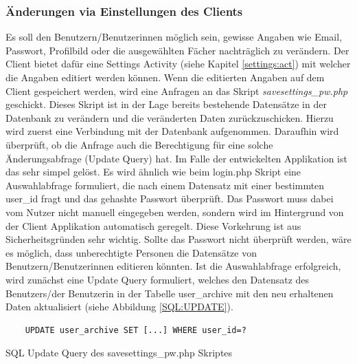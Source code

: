 \documentclass[a4paper,11pt]{report}
\newenvironment{code}{\captionsetup{type=figure}}{}
\begin{document}
					
					
					\subsubsection{Änderungen via Einstellungen des Clients}
					Es soll den Benutzern/Benutzerinnen möglich sein, gewisse Angaben wie Email, Passwort, Profilbild oder die ausgewählten Fächer nachträglich zu verändern. Der Client bietet dafür eine Settings Activity (siehe Kapitel \ref{settings:act}) mit welcher die Angaben editiert werden können. Wenn die editierten Angaben auf dem Client gespeichert werden, wird eine Anfragen an das Skript \emph{savesettings\_pw.php} geschickt. Dieses Skript ist in der Lage bereits bestehende Datensätze in der Datenbank zu verändern und die veränderten Daten zurückzuschicken. Hierzu wird zuerst eine Verbindung mit der Datenbank aufgenommen. Daraufhin wird überprüft, ob die Anfrage auch die Berechtigung für eine solche Änderungsabfrage (Update Query) hat. Im Falle der entwickelten Applikation ist das sehr simpel gelöst. Es wird ähnlich wie beim login.php Skript eine Auswahlabfrage formuliert, die nach einem Datensatz mit einer bestimmten user\_id fragt und das gehashte Passwort überprüft. Das Passwort muss dabei vom Nutzer nicht manuell eingegeben werden, sondern wird im Hintergrund von der Client Applikation automatisch geregelt. Diese Vorkehrung ist aus Sicherheitsgründen sehr wichtig. Sollte das Passwort nicht überprüft werden, wäre es möglich, dass unberechtigte Personen die Datensätze von Benutzern/Benutzerinnen editieren könnten. Ist die Auswahlabfrage erfolgreich, wird zunächst eine Update Query formuliert, welches den Datensatz des Benutzers/der Benutzerin in der Tabelle user\_archive mit den neu erhaltenen Daten aktualisiert (siehe Abbildung \ref{SQL:UPDATE}).
				\begin{code} 
					\begin{center}
						\begin{verbatim}
	UPDATE user_archive SET [...] WHERE user_id=?
						\end{verbatim}
						\caption{SQL Update Query des savesettings\_pw.php Skriptes}\label{SQL:UPDATE}
					\end{center}
				\end{code}
\end{document}
